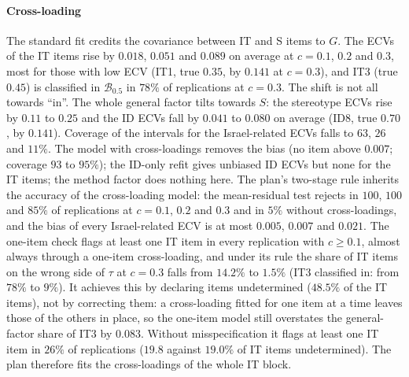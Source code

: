 \paragraph{Cross-loading}
The standard fit credits the covariance between IT and S items to $G$. The ECVs of the IT items rise by $0.018$, $0.051$ and $0.089$ on average at $c=0.1$, $0.2$ and $0.3$, most for those with low ECV (IT1, true $0.35$, by $0.141$ at $c=0.3$), and IT3 (true $0.45$) is classified in $\mathcal B_{0.5}$ in $78\%$ of replications at $c=0.3$. The shift is not all towards ``in''. The whole general factor tilts towards $S$: the stereotype ECVs rise by $0.11$ to $0.25$ and the ID ECVs fall by $0.041$ to $0.080$ on average (ID8, true $0.70$, by $0.141$). Coverage of the intervals for the Israel-related ECVs falls to $63$, $26$ and $11\%$. The model with cross-loadings removes the bias (no item above $0.007$; coverage $93$ to $95\%$); the ID-only refit gives unbiased ID ECVs but none for the IT items; the method factor does nothing here. The plan's two-stage rule inherits the accuracy of the cross-loading model: the mean-residual test rejects in $100$, $100$ and $85\%$ of replications at $c=0.1$, $0.2$ and $0.3$ and in $5\%$ without cross-loadings, and the bias of every Israel-related ECV is at most $0.005$, $0.007$ and $0.021$. The one-item check flags at least one IT item in every replication with $c\ge0.1$, almost always through a one-item cross-loading, and under its rule the share of IT items on the wrong side of $\tau$ at $c=0.3$ falls from $14.2\%$ to $1.5\%$ (IT3 classified in: from $78\%$ to $9\%$). It achieves this by declaring items undetermined ($48.5\%$ of the IT items), not by correcting them: a cross-loading fitted for one item at a time leaves those of the others in place, so the one-item model still overstates the general-factor share of IT3 by $0.083$. Without misspecification it flags at least one IT item in $26\%$ of replications ($19.8$ against $19.0\%$ of IT items undetermined). The plan therefore fits the cross-loadings of the whole IT block.


